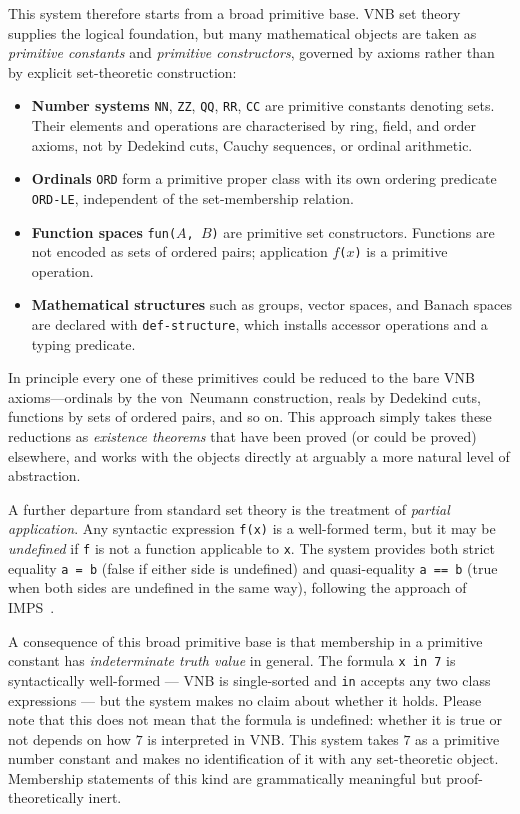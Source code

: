 This system therefore starts from a broad primitive base.  VNB set
theory supplies the logical foundation, but many mathematical objects
are taken as \emph{primitive constants} and \emph{primitive
constructors}, governed by axioms rather than by explicit
set-theoretic construction:

\begin{itemize}
\item \textbf{Number systems} \texttt{NN}, \texttt{ZZ}, \texttt{QQ},
  \texttt{RR}, \texttt{CC} are primitive constants denoting sets.  Their
  elements and operations are characterised by ring, field, and order
  axioms, not by Dedekind cuts, Cauchy sequences, or ordinal arithmetic.
\item \textbf{Ordinals} \texttt{ORD} form a primitive proper class with
  its own ordering predicate \texttt{ORD-LE}, independent of the
  set-membership relation.
\item \textbf{Function spaces} \texttt{fun($A$, $B$)} are primitive
  set constructors.  Functions are not encoded as sets of ordered
  pairs; application \texttt{$f$($x$)} is a primitive operation.
\item \textbf{Mathematical structures} such as groups, vector spaces,
  and Banach spaces are declared with \texttt{def-structure}, which
  installs accessor operations and a typing predicate.
\end{itemize}

In principle every one of these primitives could be reduced to the bare
VNB axioms---ordinals by the von~Neumann construction, reals by Dedekind
cuts, functions by sets of ordered pairs, and so on.  This approach
simply takes these reductions as \emph{existence theorems} that
have been proved (or could be proved) elsewhere, and works with the
objects directly at arguably a more natural level of abstraction.

A further departure from standard set theory is the treatment of
\emph{partial application}.  Any syntactic expression \texttt{f(x)}
is a well-formed term, but it may be \emph{undefined} if \texttt{f} is
not a function applicable to \texttt{x}.  The system provides both
strict equality \texttt{a = b} (false if either side is undefined) and
quasi-equality \texttt{a == b} (true when both sides are undefined in
the same way), following the approach of IMPS~\cite{IMPS}.

A consequence of this broad primitive base is that membership in a
primitive constant has \emph{indeterminate truth value} in general.
The formula \texttt{x in 7} is syntactically well-formed --- VNB is
single-sorted and \texttt{in} accepts any two class expressions ---
but the system makes no claim about whether it holds. Please note that
this does not mean that the formula is undefined: whether it is true
or not depends on how $7$ is interpreted in VNB. This system
takes $7$ as a primitive number constant and makes no identification
of it with any set-theoretic object.  Membership statements of this
kind are grammatically meaningful but proof-theoretically inert.

